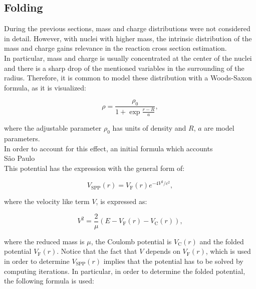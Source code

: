 \documentclass[openany]{book}
\begin{document}
\subsection{Folding} \label{sub:potential_folding}

During the previous sections, mass and charge distributions were not considered in detail. However, with nuclei with higher mass, the intrinsic distribution of the mass and charge gains relevance in the reaction cross section estimation. \\

In particular, mass and charge is usually concentrated at the center of the nuclei and there is a sharp drop of the mentioned variables in the surrounding of the radius. Therefore, it is common to model these distribution with a Woods-Saxon formula, as it is visualized: 

\begin{equation}
	\rho = \frac{\rho_0}{1 + \exp{\frac{r - R}{a}}},
\end{equation}

where the adjustable parameter $\rho_0$ has units of density and $R$, $a$ are model parameters. \\

In order to account for this effect, an initial formula which accounts  \\

São Paulo \cite{chamon_2007} \\

This potential has the expression with the general form of:

\begin{equation} \label{eq:potential_SaoPaulo}
	V_{\mathrm{SPP}} (r) = V_{\mathrm{F}} (r)e^{-4V^2/c^2},
\end{equation}

where the velocity like term $V$, is expressed as: 

\begin{equation} \label{eq:potential_SaoPaulo_speed}
	V^2 = \frac{2}{\mu} \left( E - V_{\mathrm{F}}(r) - V_{\mathrm{C}}(r) \right),
\end{equation}

where the reduced mass is $\mu$, the Coulomb potential is $V_{\mathrm{C}}(r)$ and the folded potential  $V_{\mathrm{F}}(r)$. Notice that the fact that $V$ depends on $V_{\mathrm{F}}(r)$, which is used in order to determine $V_{\mathrm{SPP}} (r)$ implies that the potential has to be solved by computing iterations. In particular, in order to determine the folded potential, the following formula is used:  
\end{document}

